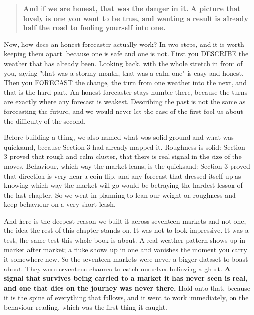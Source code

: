 \documentclass[11pt]{article} %
\begin{document}
\begin{quote}
\textbf{And if we are honest, that was the danger in it. A picture that lovely is one you want to be true, and wanting a result is already half the road to fooling yourself into one.}
\end{quote}


Now, how does an honest forecaster actually work? In two steps, and it is worth keeping them apart, because one is safe and one is not. First you DESCRIBE the weather that has already been. Looking back, with the whole stretch in front of you, saying "that was a stormy month, that was a calm one" is easy and honest. Then you FORECAST the change, the turn from one weather into the next, and that is the hard part. An honest forecaster stays humble there, because the turns are exactly where any forecast is weakest. Describing the past is not the same as forecasting the future, and we would never let the ease of the first fool us about the difficulty of the second.

Before building a thing, we also named what was solid ground and what was quicksand, because Section 3 had already mapped it. Roughness is solid: Section 3 proved that rough and calm cluster, that there is real signal in the size of the moves. Behaviour, which way the market leans, is the quicksand: Section 3 proved that direction is very near a coin flip, and any forecast that dressed itself up as knowing which way the market will go would be betraying the hardest lesson of the last chapter. So we went in planning to lean our weight on roughness and keep behaviour on a very short leash.

And here is the deepest reason we built it across seventeen markets and not one, the idea the rest of this chapter stands on. It was not to look impressive. It was a test, the same test this whole book is about. A real weather pattern shows up in market after market; a fluke shows up in one and vanishes the moment you carry it somewhere new. So the seventeen markets were never a bigger dataset to boast about. They were seventeen chances to catch ourselves believing a ghost. \textbf{A signal that survives being carried to a market it has never seen is real, and one that dies on the journey was never there.} Hold onto that, because it is the spine of everything that follows, and it went to work immediately, on the behaviour reading, which was the first thing it caught.
\end{document}
